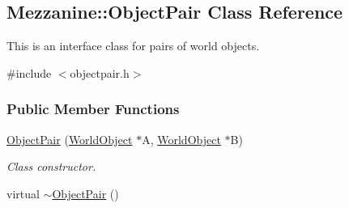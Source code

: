 \hypertarget{classMezzanine_1_1ObjectPair}{
\subsection{Mezzanine::ObjectPair Class Reference}
\label{classMezzanine_1_1ObjectPair}
}


This is an interface class for pairs of world objects.  




{\ttfamily \#include $<$objectpair.h$>$}

\subsubsection*{Public Member Functions}
\begin{DoxyCompactItemize}
\item 
\hypertarget{classMezzanine_1_1ObjectPair_ad17c0a1aabd7ff5a76c5040d518941ca}{
\hyperlink{classMezzanine_1_1ObjectPair_ad17c0a1aabd7ff5a76c5040d518941ca}{ObjectPair} (\hyperlink{classMezzanine_1_1WorldObject}{WorldObject} $\ast$A, \hyperlink{classMezzanine_1_1WorldObject}{WorldObject} $\ast$B)}
\label{classMezzanine_1_1ObjectPair_ad17c0a1aabd7ff5a76c5040d518941ca}

\begin{DoxyCompactList}\small\item\em Class constructor. \item\end{DoxyCompactList}\item 
\hypertarget{classMezzanine_1_1ObjectPair_a242416fb24217acb1eed16daddc7c194}{
virtual \hyperlink{classMezzanine_1_1ObjectPair_a242416fb24217acb1eed16daddc7c194}{$\sim$ObjectPair} ()}
\label{classMezzanine_1_1ObjectPair_a242416fb24217acb1eed16daddc7c194}


\end{DoxyCompactItemize}
